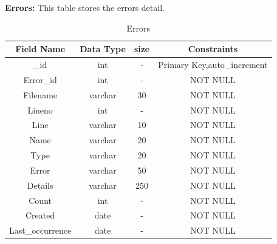 \pagebreak

\textbf{Errors:} This table stores the errors detail.\nolinebreak
\begin{table}[hp]
\centering
\begin{tabular}{|c|c|c|c|}
\hline
\textbf{Field Name}  & \textbf{Data Type}  & \textbf{size} &\textbf{Constraints}  \\
\hline
\_id &	int & - & Primary Key,auto\_increment \\\hline
Error\_id &	int & - & NOT NULL \\\hline
Filename &	varchar & 30 & NOT NULL \\\hline
Lineno &	int & - & NOT NULL \\\hline
Line &	varchar & 10 & NOT NULL \\\hline
Name &	varchar & 20 & NOT NULL \\\hline
Type & varchar	& 20 & NOT NULL \\\hline
Error & varchar & 50 & NOT NULL \\\hline
Details &	varchar &	250 & NOT NULL \\\hline
Count &	int &	- & NOT NULL \\\hline
Created &	date &	- & NOT NULL \\\hline
Last\_occurrence &	date &	- & NOT NULL \\\hline
\end{tabular}
\caption{Errors}
\end{table}

